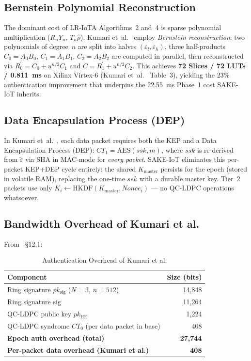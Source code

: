 \documentclass[runningheads]{llncs}
\newcommand{\Kmaster}{K_{\mathrm{master}}}
\begin{document}
\subsection{Bernstein Polynomial Reconstruction}

The dominant cost of LR-IoTA Algorithms~2 and~4 is sparse polynomial
multiplication ($R_nY_n$, $T_n\hat{\rho}$). Kumari et~al.~\cite{kumari2022}
employ \emph{Bernstein reconstruction}: two polynomials of degree~$n$ are
split into halves $(\varepsilon_l, \varepsilon_h)$, three half-products
$C_0{=}A_0B_0$, $C_1{=}A_1B_1$, $C_2{=}A_2B_2$ are computed in parallel,
then reconstructed via $R^{\prime}_0 = C_0 + u^{n/2}C_1$ and
$C = R^{\prime}_1 + u^{n/2}C_2$. This achieves
\textbf{72 Slices / 72 LUTs / 0.811~ms} on Xilinx Virtex-6
(Kumari et~al.~\cite{kumari2022} Table~3), yielding the 23\%
authentication improvement that underpins the 22.55~ms Phase~1 cost
SAKE-IoT inherits.

\subsection{Data Encapsulation Process (DEP)}

In Kumari et~al.~\cite{kumari2022}, each data packet requires both the KEP
and a Data Encapsulation Process (DEP):
$CT_1 = \mathrm{AES}(\mathit{ssk}, m)$, where $\mathit{ssk}$ is re-derived
from $\tilde{\varepsilon}$ via SHA in MAC-mode for \emph{every packet}.
SAKE-IoT eliminates this per-packet KEP+DEP cycle entirely: the shared
$\Kmaster$ persists for the epoch (stored in volatile RAM), replacing the
one-time $\mathit{ssk}$ with a durable master key. Tier~2 packets use only
$K_i \leftarrow \mathrm{HKDF}(\Kmaster, \mathit{Nonce}_i)$ --- no QC-LDPC
operations whatsoever.

\subsection{Bandwidth Overhead of Kumari et al.}

From~\cite{kumari2022} \S12.1:

\begin{table}[t]
\caption{Authentication Overhead of Kumari et al.}
\label{tab:baseoverhead}
\centering
\begin{tabular}{|l|r|}
\hline
\textbf{Component} & \textbf{Size (bits)} \\
\hline
Ring signature $pk_{\mathrm{sig}}$ ($N=3$, $n=512$) & 14,848 \\
Ring signature $\mathrm{sig}$ & 11,264 \\
QC-LDPC public key $pk_{\mathrm{HE}}$ & 1,224 \\
QC-LDPC syndrome $CT_0$ (per data packet in base) & 408 \\
\hline
\textbf{Epoch auth overhead (total)} & \textbf{27,744} \\
\textbf{Per-packet data overhead (Kumari et al.)} & \textbf{408} \\
\hline
\end{tabular}
\end{table}
\end{document}
